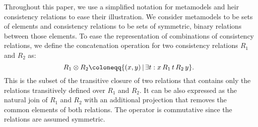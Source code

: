 Throughout this paper, we use a simplified notation for metamodels and heir consistency relations to ease their illustration. 
We consider metamodels to be sets of elements and consistency relations to be sets of symmetric, binary relations between those elements.
To ease the representation of combinations of consistency relations, we define the concatenation operation for two consistency relations $R_1$ and $R_2$ as:
\begin{equation*}
    R_1 \concat R_2 \coloneqq \{(x,y)\, |\, \exists t: x\, R_1\, t\, R_2\, y \}.
\end{equation*}
This is the subset of the transitive closure of two relations that contains only the relations transitively defined over $R_1$ and $R_2$.
It can be also expressed as the natural join of $R_1$ and $R_2$ with an additional projection that removes the common elements of both relations.
The operator is commutative since the relations are assumed symmetric.



